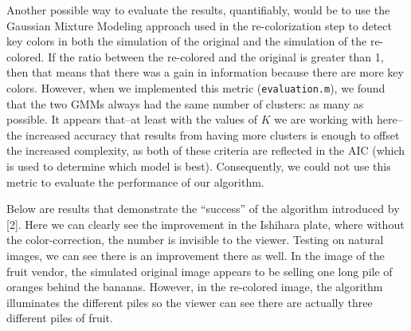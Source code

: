 \documentclass[10pt,twocolumn,letterpaper]{article}
\begin{document}
Another possible way to evaluate the results, quantifiably, would be to use the Gaussian Mixture Modeling approach used in the re-colorization step to detect key colors in both the simulation of the original and the simulation of the re-colored. If the ratio between the re-colored and the original is greater than 1, then that means that there was a gain in information because there are more key colors. However, when we implemented this metric (\texttt{evaluation.m}), we found that the two GMMs always had the same number of clusters: as many as possible. It appears that--at least with the values of $K$ we are working with here--the increased accuracy that results from having more clusters is enough to offset the increased complexity, as both of these criteria are reflected in the AIC (which is used to determine which model is best). Consequently, we could not use this metric to evaluate the performance of our algorithm. 

Below are results that demonstrate the ``success'' of the algorithm introduced by [2]. Here we can clearly see the improvement in the Ishihara plate, where without the color-correction, the number is invisible to the viewer. Testing on natural images, we can see there is an improvement there as well. In the image of the fruit vendor, the simulated original image appears to be selling one long pile of oranges behind the bananas. However, in the re-colored image, the algorithm illuminates the different piles so the viewer can see there are actually three different piles of fruit. 
\end{document}
